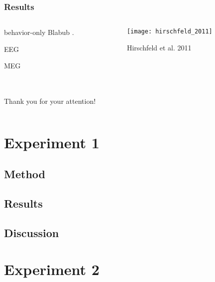 \documentclass{beamer}					%
\begin{document}
\begin{frame}\frametitle{Results}
\begin{columns}
\begin{column}{0.6\textwidth}
	\begin{block}{behavior-only}
	Blabub \cite{Hirschfeld2010,Hirschfeld2011,Thielsch2010}.
	\end{block}
	\begin{block}{EEG}
	\cite{Hirschfeld2008}
	\end{block}
	\begin{block}{MEG}
	\cite{Hirschfeld2011a}
	\end{block}
\end{column}
\begin{column}{0.3\textwidth}
\begin{figure}[htbp] %
	\centering
	\texttt{[image: hirschfeld\_2011]}
	\caption{Hirschfeld et al. 2011}
\end{figure}
\end{column}
\end{columns}
\end{frame}

\begin{frame}\frametitle{}
\begin{columns}
\begin{column}{0.5\textwidth}
	\begin{block}{Thank you for your attention!}
	\end{block}
\end{column}
\end{columns}
\end{frame}

\section{Experiment 1}
\subsection{Method}
\subsection{Results}
\subsection{Discussion}
\section{Experiment 2}
\end{document}
